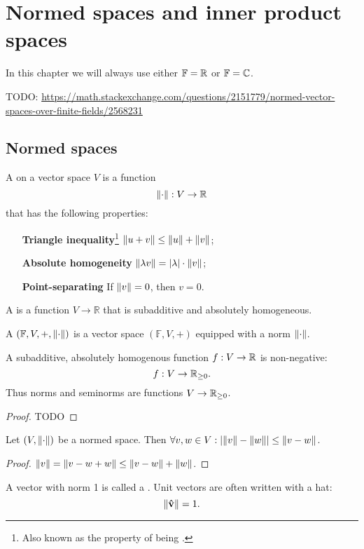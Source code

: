 \chapter{Normed spaces and inner product spaces}
In this chapter we will always use either $\mathbb{F} = \mathbb{R}$ or $\mathbb{F} = \mathbb{C}$.

TODO: \url{https://math.stackexchange.com/questions/2151779/normed-vector-spaces-over-finite-fields/2568231}
\section{Normed spaces}
\begin{definition}
A  on a vector space $V$ is a function
\[ \lVert\cdot\rVert: V \to \mathbb{R} \]
that has the following properties:
\begin{itemize}[leftmargin=6cm]
\item[\textbf{Triangle inequality}\footnote{Also known as the property of being \udef{subadditive}.}] $\lVert u+v\rVert \leq \lVert u\rVert+\lVert v\rVert$;
\item[\textbf{Absolute homogeneity}] $\lVert\lambda v\rVert = |\lambda|\cdot\lVert v\rVert$;
\item[\textbf{Point-separating}] If $\lVert v\rVert = 0$, then $v = 0$.
\end{itemize}
A  is a function $V\to \mathbb{R}$ that is subadditive and absolutely homogeneous.

A  $(\mathbb{F},V,+,\lVert\cdot\rVert)$ is a vector space $(\mathbb{F},V,+)$ equipped with a norm $\lVert\cdot\rVert$.
\end{definition}
\begin{lemma}
A subadditive, absolutely homogenous function $f:V\to \mathbb{R}$ is non-negative:
\[ f: V\to \mathbb{R}_{\geq 0}. \]
Thus norms and seminorms are functions $V\to \mathbb{R}_{\geq 0}$.
\end{lemma}
\begin{proof}
TODO
\end{proof}

\begin{lemma}
Let $(V,\lVert\cdot\rVert)$ be a normed space. Then $\forall v,w\in V: |\lVert v\rVert-\lVert w\rVert|\leq \lVert v-w\rVert$.
\end{lemma}
\begin{proof}
$\lVert v\rVert = \lVert v-w+w\rVert \leq \lVert v-w\rVert + \lVert w\rVert$.
\end{proof}

\begin{definition}
A vector with norm 1 is called a . Unit vectors are often written with a hat:
\[ \lVert\bm{\mathrm{\hat{v}}}\rVert = 1. \]
\end{definition}

